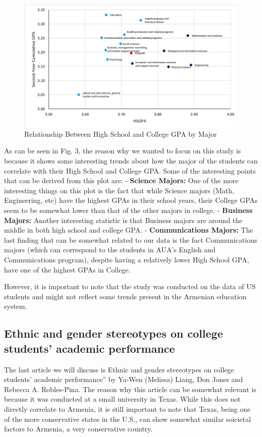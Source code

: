 \documentclass[
  12pt,
]{article}
\begin{document}
\begin{figure}
\includegraphics[width=0.95\linewidth]{collegeboard} \caption{Relationship Between High School and College GPA by Major}\label{fig:unnamed-chunk-7}
\end{figure}

As can be seen in Fig. 3, the reason why we wanted to focus on this
study is because it shows some interesting trends about how the major of
the students can correlate with their High School and College GPA. Some
of the interesting points that can be derived from this plot are: -
\textbf{Science Majors:} One of the more interesting things on this plot
is the fact that while Science majors (Math, Engineering, etc) have the
highest GPAs in their school years, their College GPAs seem to be
somewhat lower than that of the other majors in college. -
\textbf{Business Majors:} Another interesting statistic is that Business
majors are around the middle in both high school and college GPA. -
\textbf{Communications Majors:} The last finding that can be somewhat
related to our data is the fact Communications majors (which can
correspond to the students in AUA's English and Communications program),
despite having a relatively lower High School GPA, have one of the
highest GPAs in College.

However, it is important to note that the study was conducted on the
data of US students and might not reflect some trends present in the
Armenian education system.

\subsection{Ethnic and gender stereotypes on college students' academic
performance}\label{ethnic-and-gender-stereotypes-on-college-students-academic-performance}

The last article we will discuss is Ethnic and gender stereotypes on
college students' academic performance'' by Ya-Wen (Melissa) Liang, Don
Jones and Rebecca A. Robles-Pina. The reason why this article can be
somewhat relevant is because it was conducted at a small university in
Texas. While this does not directly correlate to Armenia, it is still
important to note that Texas, being one of the more conservative states
in the U.S., can show somewhat similar soicietal factors to Armenia, a
very conservative country.
\end{document}
